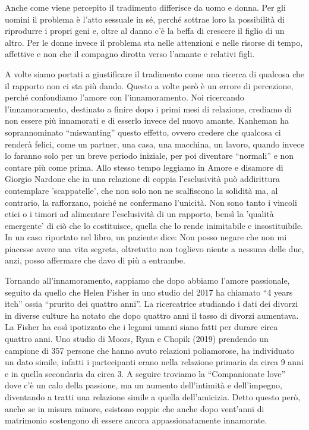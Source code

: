 \documentclass[12pt]{book} %
\begin{document}
Anche come viene percepito il tradimento differisce da uomo e donna. Per gli uomini il problema è
l'atto sessuale in sé, perché sottrae loro la possibilità di riprodurre i propri geni e, oltre al
danno c'è la beffa di crescere il figlio di un altro. Per le donne invece il problema sta nelle
attenzioni e nelle risorse di tempo, affettive e non che il compagno dirotta verso l'amante e
relativi figli. 

A volte siamo portati a giustificare il tradimento come una ricerca di qualcosa che il rapporto non ci sta più dando.
Questo a volte però è un errore di percezione, perché confondiamo l'amore con
l'innamoramento. Noi ricercando l'innamoramento, destinato a finire dopo i
primi mesi di relazione, crediamo di non essere più innamorati e di esserlo invece del nuovo amante. 
Kanheman ha soprannominato “miswanting” questo effetto, ovvero credere che qualcosa ci renderà felici, come un partner,
una casa, una macchina, un lavoro, quando invece lo faranno solo per un breve periodo iniziale, per poi
diventare “normali” e non contare più come prima. 
Allo stesso tempo leggiamo in Amore e disamore di Giorgio Nardone che
in una relazione di coppia l'esclusività può addirittura contemplare
'scappatelle', che non solo non ne scalfiscono la solidità ma, al contrario,
la rafforzano, poiché ne confermano l'unicità.
Non sono tanto i vincoli etici o i timori ad alimentare l'esclusività di un rapporto, bensì la
'qualità emergente' di ciò che lo costituisce, quella che lo rende
inimitabile e insostituibile. In un caso riportato nel libro, un paziente dice: Non posso negare che non mi piacesse
avere una vita segreta, oltretutto non toglievo niente a nessuna delle due, anzi, posso affermare che davo di più a entrambe.

Tornando all'innamoramento, sappiamo che dopo abbiamo l'amore passionale, seguito da quello che
Helen Fisher in uno studio del 2017 ha chiamato “4 years itch” ossia “prurito dei quattro anni”. La ricercatrice
studiando i dati dei divorzi in diverse culture ha notato che dopo quattro anni il tasso di divorzi aumentava. La
Fisher ha così ipotizzato che i legami umani siano fatti per durare circa quattro anni. Uno studio
di Moors, Ryan e Chopik (2019) prendendo un campione di 357 persone che hanno avuto relazioni poliamorose, ha
individuato un dato simile, infatti i partecipanti erano nella relazione primaria da circa 9 anni e in quella
secondaria da circa 3. A seguire troviamo la “Companionate love” dove c'è un calo della passione,
ma un aumento dell'intimità e dell'impegno, diventando a tratti una relazione
simile a quella dell'amicizia. Detto questo però, anche se in misura minore, esistono
coppie che anche dopo vent'anni di matrimonio sostengono di essere ancora appassionatamente
innamorate. 
\end{document}
